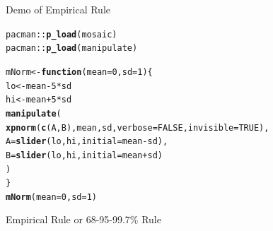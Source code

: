 \documentclass[10pt]{beamer}\usepackage[]{graphicx}\usepackage[]{color}
\makeatletter
\newcommand{\hlnum}[1]{\textcolor[rgb]{0.686,0.059,0.569}{#1}}%
\newcommand{\hlopt}[1]{\textcolor[rgb]{0,0,0}{#1}}%
\newcommand{\hlstd}[1]{\textcolor[rgb]{0.345,0.345,0.345}{#1}}%
\newcommand{\hlkwa}[1]{\textcolor[rgb]{0.161,0.373,0.58}{\textbf{#1}}}%
\newcommand{\hlkwb}[1]{\textcolor[rgb]{0.69,0.353,0.396}{#1}}%
\newcommand{\hlkwc}[1]{\textcolor[rgb]{0.333,0.667,0.333}{#1}}%
\newcommand{\hlkwd}[1]{\textcolor[rgb]{0.737,0.353,0.396}{\textbf{#1}}}%
\newenvironment{kframe}{%
 \def\at@end@of@kframe{}%
 \ifinner\ifhmode%
  \def\at@end@of@kframe{\end{minipage}}%
  \begin{minipage}{\columnwidth}%
 \fi\fi%
 \def\FrameCommand##1{\hskip\@totalleftmargin \hskip-\fboxsep
 \colorbox{shadecolor}{##1}\hskip-\fboxsep
     \hskip-\linewidth \hskip-\@totalleftmargin \hskip\columnwidth}%
 \MakeFramed {\advance\hsize-\width
   \@totalleftmargin\z@ \linewidth\hsize
   \@setminipage}}%
 {\par\unskip\endMakeFramed%
 \at@end@of@kframe}
\newenvironment{knitrout}{}{} %
\makeatother
\begin{document}
\begin{frame}[fragile]{Demo of Empirical Rule}
	
\begin{knitrout}\tiny
{}\color{fgcolor}\begin{kframe}
\begin{alltt}
\hlstd{pacman}\hlopt{::}\hlkwd{p_load}\hlstd{(mosaic)}
\hlstd{pacman}\hlopt{::}\hlkwd{p_load}\hlstd{(manipulate)}

\hlstd{mNorm} \hlkwb{<-} \hlkwa{function}\hlstd{(}\hlkwc{mean} \hlstd{=} \hlnum{0}\hlstd{,} \hlkwc{sd} \hlstd{=} \hlnum{1}\hlstd{) \{}
\hlstd{lo} \hlkwb{<-} \hlstd{mean} \hlopt{-} \hlnum{5} \hlopt{*} \hlstd{sd}
\hlstd{hi} \hlkwb{<-} \hlstd{mean} \hlopt{+} \hlnum{5} \hlopt{*} \hlstd{sd}
\hlkwd{manipulate}\hlstd{(}
\hlkwd{xpnorm}\hlstd{(}\hlkwd{c}\hlstd{(A,B), mean, sd,} \hlkwc{verbose} \hlstd{=} \hlnum{FALSE}\hlstd{,} \hlkwc{invisible} \hlstd{=} \hlnum{TRUE}\hlstd{),}
\hlkwc{A} \hlstd{=} \hlkwd{slider}\hlstd{(lo, hi,} \hlkwc{initial} \hlstd{= mean} \hlopt{-} \hlstd{sd),}
\hlkwc{B} \hlstd{=} \hlkwd{slider}\hlstd{(lo, hi,} \hlkwc{initial} \hlstd{= mean} \hlopt{+} \hlstd{sd)}
\hlstd{)}
\hlstd{\}}
\hlkwd{mNorm}\hlstd{(}\hlkwc{mean} \hlstd{=} \hlnum{0}\hlstd{,} \hlkwc{sd} \hlstd{=} \hlnum{1}\hlstd{)}
\end{alltt}
\end{kframe}
\end{knitrout}
\end{frame}


\begin{frame}[fragile]{Empirical Rule or 68-95-99.7\% Rule}
	
	
\end{frame}
\end{document}
